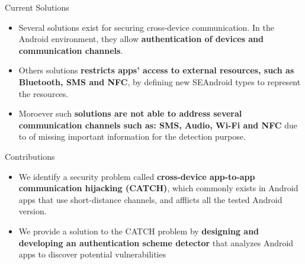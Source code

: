 \documentclass[10pt]{beamer}
\begin{document}
\begin{frame}[fragile]{Current Solutions}
  \begin{itemize}

  \item Several solutions exist for securing cross-device
    communication.  In the Android environment, they allow
    {\bf authentication of devices and communication channels}.

  \item Others solutions {\bf restricts apps’ access to external
      resources, such as Bluetooth, SMS and NFC}, by defining new
    SEAndroid types to represent the resources.

  \item Moroever such {\bf solutions are not able to address several
      communication channels such as: SMS, Audio, Wi-Fi and NFC} due
    to of missing important information for the detection purpose.

  \end{itemize} 

  
\end{frame}


\begin{frame}[fragile]{Contributions}


 \begin{itemize}
  

 \item We identify a security problem called {\bf cross-device
     app-to-app communication hijacking (CATCH)}, which commonly
   exists in Android apps that use short-distance channels, and
   afflicts all the tested Android version.

 \item We provide a solution to the CATCH problem by {\bf designing
     and developing an authentication scheme detector} that analyzes
   Android apps to discover potential vulnerabilities


\end{itemize}
  
\end{frame}
\end{document}
